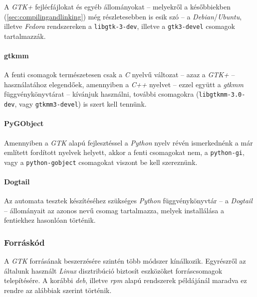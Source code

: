 A \textit{GTK+} fejlécfájlokat és egyéb állományokat -- melyekről a későbbiekben (\ref{sec:compilingandlinking}) még részletesebben is esik szó -- a \textit{Debian}/\textit{Ubuntu}, illetve \textit{Fedora} rendszereken a \texttt{libgtk-3-dev}, illetve a \texttt{gtk3-devel} csomagok tartalmazzák.

\paragraph{gtkmm}

A fenti csomagok természetesen csak a \textit{C} nyelvű változat -- azaz a \textit{GTK+} -- használatához elegendőek, amennyiben a \textit{C++} nyelvet -- ezzel együtt a \textit{gtkmm} függvénykönyvtárat -- kívánjuk használni, további csomagokra (\texttt{libgtkmm-3.0-dev}, vagy \texttt{gtkmm3-devel}) is szert kell tennünk.

\paragraph{PyGObject}

Amennyiben a \textit{GTK} alapú fejlesztéssel a \textit{Python} nyelv révén ismerkednénk a már említett fordított nyelvek helyett, akkor a fenti csomagokat nem, a \texttt{python-gi}, vagy a \texttt{python-gobject} csomagokat viszont be kell szereznünk.

\paragraph{Dogtail}

Az automata tesztek készítéséhez szükséges \textit{Python} függvénykönyvtár -- a \textit{Dogtail} -- állományait az azonos nevű csomag tartalmazza, melyek installálása a fentiekhez hasonlóan történik.

\subsubsection{Forráskód}

A \textit{GTK} forrásának beszerzésére szintén több módszer kínálkozik. Egyrészről az általunk használt \textit{Linux} disztribúció biztosít eszközöket forráscsomagok telepítésére. A korábbi \textit{deb}, illetve \textit{rpm} alapú rendszerek példájánál maradva ez rendre az alábbiak szerint történik.

